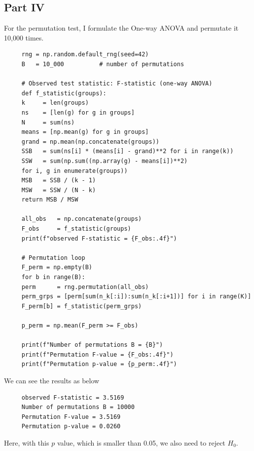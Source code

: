 \documentclass[letterpaper]{article}
\begin{document}
\clearpage
\subsection{Part IV}
For the permutation test, I formulate the One-way ANOVA and permutate it 10,000 times. 
			
\begin{lstlisting}
     rng = np.random.default_rng(seed=42)
     B   = 10_000          # number of permutations
     
     # Observed test statistic: F-statistic (one-way ANOVA)
     def f_statistic(groups):
     k     = len(groups)
     ns    = [len(g) for g in groups]
     N     = sum(ns)
     means = [np.mean(g) for g in groups]
     grand = np.mean(np.concatenate(groups))
     SSB   = sum(ns[i] * (means[i] - grand)**2 for i in range(k))
     SSW   = sum(np.sum((np.array(g) - means[i])**2)
     for i, g in enumerate(groups))
     MSB   = SSB / (k - 1)
     MSW   = SSW / (N - k)
     return MSB / MSW
     
     all_obs   = np.concatenate(groups)
     F_obs     = f_statistic(groups)
     print(f"observed F-statistic = {F_obs:.4f}")
     
     # Permutation loop
     F_perm = np.empty(B)
     for b in range(B):
     perm      = rng.permutation(all_obs)
     perm_grps = [perm[sum(n_k[:i]):sum(n_k[:i+1])] for i in range(K)]
     F_perm[b] = f_statistic(perm_grps)
     
     p_perm = np.mean(F_perm >= F_obs)
     
     print(f"Number of permutations B = {B}")
     print(f"Permutation F-value = {F_obs:.4f}")
     print(f"Permutation p-value = {p_perm:.4f}")
\end{lstlisting}

We can see the results as below

\begin{minipage}{\linewidth}
	\begin{Verbatim}
     observed F-statistic = 3.5169
     Number of permutations B = 10000
     Permutation F-value = 3.5169
     Permutation p-value = 0.0260
	\end{Verbatim}
\end{minipage}

Here, with this $p$ value, which is smaller than 0.05, we also need to reject $H_0$.

			
		
		\clearpage
	
\end{document}
